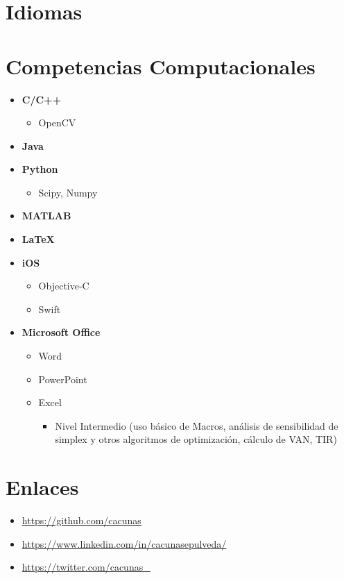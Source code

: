 \documentclass[10pt,letterpaper,sans]{moderncv}
\begin{document}
\section{Idiomas}
\label{sec:org669ecce}
\section{Competencias Computacionales}
\label{sec:org544fd0f}
\begin{itemize}
\item \textbf{C/C++}
\begin{itemize}
\item OpenCV
\end{itemize}
\item \textbf{Java}
\item \textbf{Python}
\begin{itemize}
\item Scipy, Numpy
\end{itemize}
\item \textbf{MATLAB}
\item \textbf{\LaTeX}
\item \textbf{iOS}
\begin{itemize}
\item Objective-C
\item Swift
\end{itemize}
\item \textbf{Microsoft Office}
\begin{itemize}
\item Word
\item PowerPoint
\item Excel
\begin{itemize}
\item Nivel Intermedio (uso básico de Macros, análisis de sensibilidad de simplex y otros
algoritmos de optimización, cálculo de VAN, TIR)
\end{itemize}
\end{itemize}
\end{itemize}
\section{Enlaces}
\begin{itemize}
\item \url{https://github.com/cacunas}
\item \url{https://www.linkedin.com/in/cacunasepulveda/} 
\item \url{https://twitter.com/cacunas_}
\end{itemize}
\end{document}
